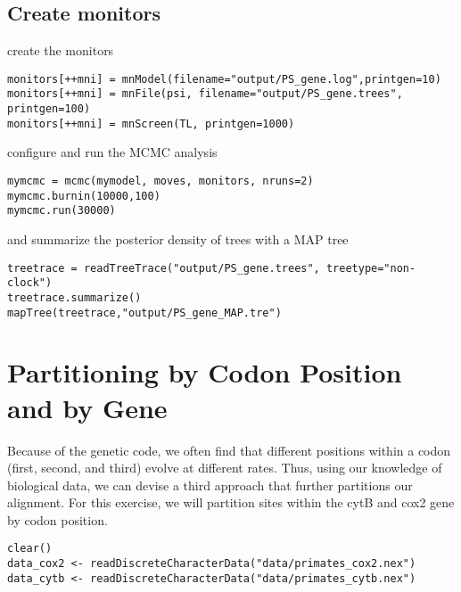 \subsection{Create monitors}

create the monitors

{\tt \begin{snugshade*}
\begin{lstlisting}
monitors[++mni] = mnModel(filename="output/PS_gene.log",printgen=10)
monitors[++mni] = mnFile(psi, filename="output/PS_gene.trees", printgen=100)
monitors[++mni] = mnScreen(TL, printgen=1000)
\end{lstlisting}
\end{snugshade*}}

configure and run the MCMC analysis

{\tt \begin{snugshade*}
\begin{lstlisting}
mymcmc = mcmc(mymodel, moves, monitors, nruns=2)
mymcmc.burnin(10000,100)
mymcmc.run(30000)
\end{lstlisting}
\end{snugshade*}}

and summarize the posterior density of trees with a MAP tree

{\tt \begin{snugshade*}
\begin{lstlisting}
treetrace = readTreeTrace("output/PS_gene.trees", treetype="non-clock")
treetrace.summarize()
mapTree(treetrace,"output/PS_gene_MAP.tre")
\end{lstlisting}
\end{snugshade*}}



\section{Partitioning by Codon Position and by Gene}\label{secExtremeP}

Because of the genetic code, we often find that different positions within a codon (first, second, and third) evolve at different rates.
Thus, using our knowledge of biological data, we can devise a third approach that further partitions our alignment. 
For this exercise, we will partition sites within the cytB and cox2 gene by codon position.

{\tt \begin{snugshade*}
\begin{lstlisting}
clear()
data_cox2 <- readDiscreteCharacterData("data/primates_cox2.nex")
data_cytb <- readDiscreteCharacterData("data/primates_cytb.nex")
\end{lstlisting}
\end{snugshade*}}

